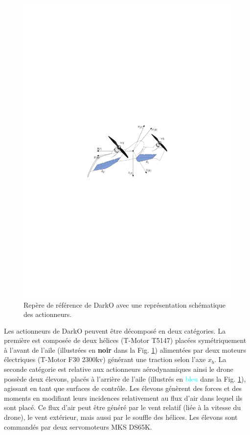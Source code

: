 
\begin{figure}[ht!]
    \centering
    \includegraphics[width=0.8\columnwidth]{figures/darko.pdf }
    \caption{Repère de référence de DarkO avec une représentation schématique des actionneurs.}
    \label{fig:darko2}
\end{figure}

Les actionneurs de DarkO peuvent être décomposé en deux catégories. La première est composée de deux hélices (T-Motor T5147) placées symétriquement à l'avant de l'aile (illustrées en \textbf{noir} dans la Fig. \ref{fig:darko2}) alimentées par deux moteurs électriques (T-Motor F30 2300kv) générant une traction selon l'axe $x_{b}$. La seconde catégorie est relative aux actionneurs aérodynamiques ainsi le drone possède deux élevons, placés à l'arrière de l'aile (illustrés en \textcolor{cyan}{bleu} dans la Fig. \ref{fig:darko2}), agissant en tant que surfaces de contrôle. Les élevons génèrent des forces et des moments en modifiant leurs incidences relativement au flux d'air dans lequel ils sont placé. Ce flux d'air peut être généré par le vent relatif (liée à la vitesse du drone), le vent extérieur, mais aussi par le souffle des hélices. Les élevons sont commandés par deux servomoteurs MKS DS65K.

